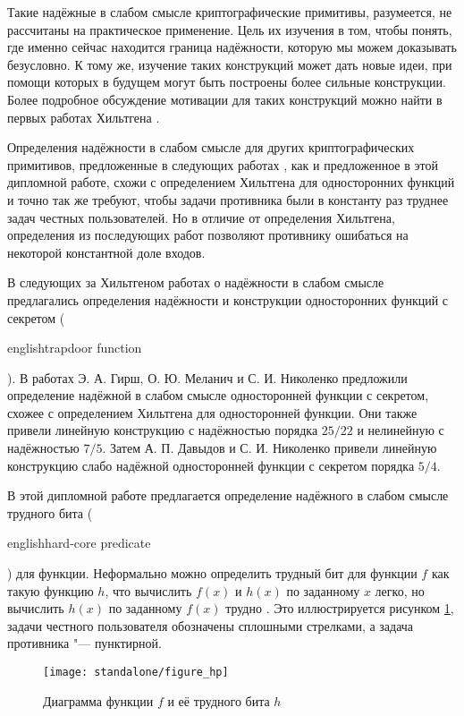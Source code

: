 \documentclass[a4paper, 14pt]{extarticle}
\begin{document}
Такие надёжные в слабом смысле криптографические примитивы, разумеется, не
рассчитаны на практическое применение. Цель их изучения в том, чтобы понять,
где именно сейчас находится граница надёжности, которую мы можем доказывать
безусловно. К тому же, изучение таких конструкций может дать новые идеи, при
помощи которых в будущем могут быть построены более сильные конструкции. Более
подробное обсуждение мотивации для таких конструкций можно найти в первых работах
Хильтгена \cite{hiltgen1993,hiltgen1994}.

Определения надёжности в слабом смысле для других криптографических примитивов,
предложенные в следующих работах \cite{HN09,DN11,hirsch_milanich_nikolenko},
как и предложенное в этой дипломной работе, схожи с определением Хильтгена для
односторонних функций и точно так же требуют, чтобы задачи противника были в
константу раз труднее задач честных пользователей. Но в отличие от определения
Хильтгена, определения из последующих работ позволяют противнику ошибаться на
некоторой константной доле входов.

В следующих за Хильтгеном работах о надёжности в слабом смысле предлагались
определения надёжности и конструкции односторонних функций с секретом
(\begin{foreignlanguage}{english}trapdoor function\end{foreignlanguage}). В
работах \cite{HN09,hirsch_milanich_nikolenko} Э. А. Гирш, О. Ю. Меланич и С. И.
Николенко предложили определение надёжной в слабом смысле односторонней функции
с секретом, схожее с определением Хильтгена для односторонней функции. Они
также привели линейную конструкцию с надёжностью порядка $25/22$ и нелинейную
с надёжностью $7/5$. Затем \cite{DN11} А. П. Давыдов и С. И. Николенко привели
линейную конструкцию слабо надёжной односторонней функции с секретом порядка
$5/4$.

В этой дипломной работе предлагается определение надёжного в слабом
смысле трудного бита (\begin{foreignlanguage}{english}hard-core
predicate\end{foreignlanguage}) для функции. Неформально можно определить
трудный бит для функции $f$ как такую функцию $h$, что вычислить $f(x)$ и
$h(x)$ по заданному $x$ легко, но вычислить $h(x)$ по заданному $f(x)$ трудно
\cite{goldreich}. Это иллюстрируется рисунком \ref{fig_hp}, задачи честного
пользователя обозначены сплошными стрелками, а задача противника "---
пунктирной.

\begin{figure}[h]
\centering
\texttt{[image: standalone/figure\_hp]}
\caption{Диаграмма функции $f$ и её трудного бита $h$}
\label{fig_hp}
\end{figure}
\end{document}
